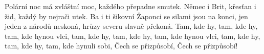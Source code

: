 \ve{}
Polární noc
má zvláštní moc,
každého přepadne smutek. Němec i Brit,
křesťan i žid,
každý by nejrači utek.
Ba i ti šikovní Žaponci
se silami jsou na konci,
jen jeden z národů neskoná,
hrůzy severu slavně překoná.
\cho{}
Tam, kde hy, tam, kde hy,
tam, kde hynou vlci,
tam, kde hy, tam, kde hy,
tam, kde hynou vlci,
tam, kde hy, tam, kde hy,
tam, kde hynuli sobi,
Čech se přizpůsobí,
Čech se přizpůsobí!
\esong{}